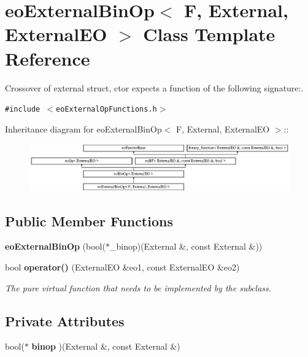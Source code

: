 \section{eo\-External\-Bin\-Op$<$ F, External, External\-EO $>$ Class Template Reference}
\label{classeo_external_bin_op}
Crossover of external struct, ctor expects a function of the following signature:.  


{\tt \#include $<$eo\-External\-Op\-Functions.h$>$}

Inheritance diagram for eo\-External\-Bin\-Op$<$ F, External, External\-EO $>$::\begin{figure}[H]
\begin{center}
\leavevmode
\includegraphics[height=2.04566cm]{classeo_external_bin_op}
\end{center}
\end{figure}
\subsection*{Public Member Functions}
\begin{CompactItemize}
\item 
{\bf eo\-External\-Bin\-Op} (bool($\ast$\_\-binop)(External \&, const External \&))\label{classeo_external_bin_op_a0}

\item 
bool {\bf operator()} (External\-EO \&eo1, const External\-EO \&eo2)\label{classeo_external_bin_op_a1}

\begin{CompactList}\small\item\em The pure virtual function that needs to be implemented by the subclass. \item\end{CompactList}\end{CompactItemize}
\subsection*{Private Attributes}
\begin{CompactItemize}
\item 
bool($\ast$ {\bf binop} )(External \&, const External \&)\label{classeo_external_bin_op_r0}

\end{CompactItemize}


